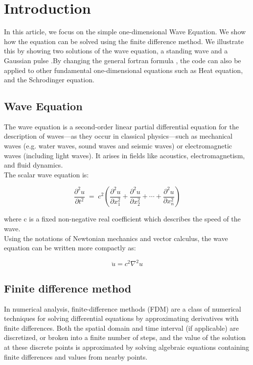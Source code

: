 \documentclass[oneside,hidelinks]{book}
\begin{document}

        \tableofcontents
        \parindent=0pt
        \parskip=3pt
        
        \chapter{Introduction}

        In this article, we focus on the simple one-dimensional Wave Equation. 
        We show how the equation can be solved using the finite difference method. 
        We illustrate this by showing two solutions of the wave equation, a standing wave and a Gaussian pulse
        .By changing the general fortran formula , 
        the code can also be applied to other fundamental 
        one-dimensional equations such as Heat equation, and the Schrodinger equation.

  
                \section{Wave Equation}
                The wave equation is a second-order linear partial differential equation for 
                the description of waves—as they occur in classical physics—such as mechanical 
                waves (e.g. water waves, sound waves and seismic waves) or electromagnetic waves
                 (including light waves). It arises in fields like acoustics, electromagnetism, 
                 and fluid dynamics.\\ The scalar wave equation is:
                  
                $${\displaystyle {\frac {\partial ^{2}u}{\partial t^{2}}}\;=\;c^{2}\left({\frac {\partial ^{2}u}{\partial x_{1}^{2}}}+{\frac {\partial ^{2}u}{\partial x_{2}^{2}}}+\cdots +{\frac {\partial ^{2}u}{\partial x_{n}^{2}}}\right)}$$
                 
              where c is a fixed non-negative real coefficient which describes the speed of the wave.\\
              Using the notations of Newtonian mechanics and vector calculus, the wave equation can be written more compactly as:

              $${\displaystyle {\ddot {u}}=c^{2}\nabla ^{2}u}$$

                



 
                \section{Finite difference method}
                In numerical analysis, finite-difference methods (FDM) are a class of numerical techniques for solving differential equations by approximating derivatives with finite differences. Both the spatial domain and time interval (if applicable) are discretized, or broken into a finite number of steps, and the value of the solution at these discrete points is approximated by solving algebraic equations containing finite differences and values from nearby points.
\end{document}
